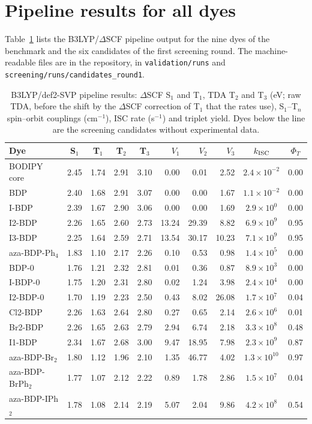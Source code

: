 \section{Pipeline results for all dyes}
Table~\ref{tab:allpipe} lists the B3LYP/$\Delta$SCF pipeline output for the nine dyes of the benchmark and the six
candidates of the first screening round. The machine-readable files are in the repository, in
\texttt{validation/runs} and \texttt{screening/runs/candidates\_round1}.

\begin{table}
  \caption{B3LYP/def2-SVP pipeline results: $\Delta$SCF S$_1$ and T$_1$, TDA T$_2$ and T$_3$ (eV; raw TDA, before the shift by the $\Delta$SCF correction of T$_1$ that the rates use), S$_1$--T$_n$
  spin--orbit couplings (cm$^{-1}$), ISC rate (s$^{-1}$) and triplet yield. Dyes below the line are the screening
  candidates without experimental data.}
  \label{tab:allpipe}
  \small
  \begin{tabular}{lccccrrrcc}
    \toprule
    Dye & S$_1$ & T$_1$ & T$_2$ & T$_3$ & $V_1$ & $V_2$ & $V_3$ & $k_\mathrm{ISC}$ & $\Phi_T$ \\
    \midrule
    BODIPY core & 2.45 & 1.74 & 2.91 & 3.10 & 0.00 & 0.01 & 2.52 & $2.4\times10^{-2}$ & 0.00 \\
    BDP & 2.40 & 1.68 & 2.91 & 3.07 & 0.00 & 0.00 & 1.67 & $1.1\times10^{-2}$ & 0.00 \\
    I-BDP & 2.39 & 1.67 & 2.90 & 3.06 & 0.00 & 0.00 & 1.69 & $2.9\times10^{0}$ & 0.00 \\
    I2-BDP & 2.26 & 1.65 & 2.60 & 2.73 & 13.24 & 29.39 & 8.82 & $6.9\times10^{9}$ & 0.95 \\
    I3-BDP & 2.25 & 1.64 & 2.59 & 2.71 & 13.54 & 30.17 & 10.23 & $7.1\times10^{9}$ & 0.95 \\
    aza-BDP-Ph$_4$ & 1.83 & 1.10 & 2.17 & 2.26 & 0.10 & 0.53 & 0.98 & $1.4\times10^{5}$ & 0.00 \\
    BDP-0 & 1.76 & 1.21 & 2.32 & 2.81 & 0.01 & 0.36 & 0.87 & $8.9\times10^{3}$ & 0.00 \\
    I-BDP-0 & 1.75 & 1.20 & 2.31 & 2.80 & 0.02 & 1.24 & 3.98 & $2.4\times10^{4}$ & 0.00 \\
    I2-BDP-0 & 1.70 & 1.19 & 2.23 & 2.50 & 0.43 & 8.02 & 26.08 & $1.7\times10^{7}$ & 0.04 \\
    \midrule
    Cl2-BDP & 2.26 & 1.63 & 2.64 & 2.80 & 0.27 & 0.65 & 2.14 & $2.6\times10^{6}$ & 0.01 \\
    Br2-BDP & 2.26 & 1.65 & 2.63 & 2.79 & 2.94 & 6.74 & 2.18 & $3.3\times10^{8}$ & 0.48 \\
    I1-BDP & 2.34 & 1.67 & 2.68 & 3.00 & 9.47 & 18.95 & 7.98 & $2.3\times10^{9}$ & 0.87 \\
    aza-BDP-Br$_2$ & 1.80 & 1.12 & 1.96 & 2.10 & 1.35 & 46.77 & 4.02 & $1.3\times10^{10}$ & 0.97 \\
    aza-BDP-BrPh$_2$ & 1.77 & 1.07 & 2.12 & 2.22 & 0.89 & 1.78 & 2.86 & $1.5\times10^{7}$ & 0.04 \\
    aza-BDP-IPh$_2$ & 1.78 & 1.08 & 2.14 & 2.19 & 5.07 & 2.04 & 9.86 & $4.2\times10^{8}$ & 0.54 \\
    \bottomrule
  \end{tabular}
\end{table}


